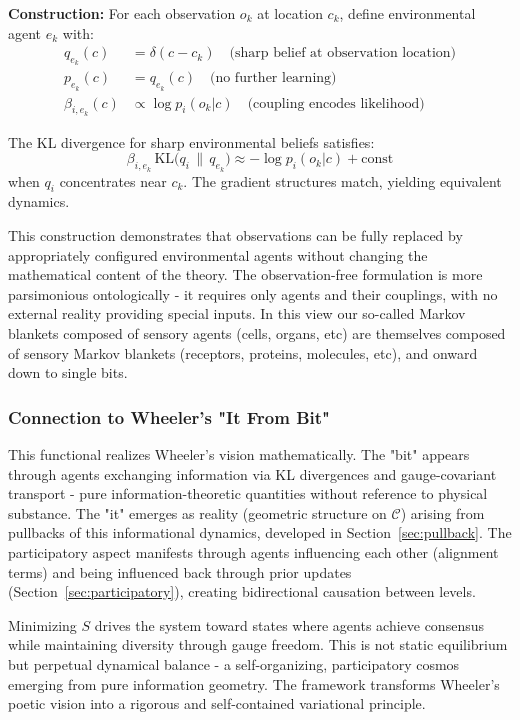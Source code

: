 \documentclass[11pt]{article}
\begin{document}
\textbf{Construction:} For each observation $o_k$ at location $c_k$, define environmental agent $e_k$ with:
\begin{align}
q_{e_k}(c) &= \delta(c - c_k) \quad \text{(sharp belief at observation location)} \\
p_{e_k}(c) &= q_{e_k}(c) \quad \text{(no further learning)} \\
\beta_{i,e_k}(c) &\propto \log p_i(o_k|c) \quad \text{(coupling encodes likelihood)}
\end{align}

The KL divergence for sharp environmental beliefs satisfies:
\begin{equation}
\beta_{i,e_k} \, \mathrm{KL}\big(q_i \,\|\, q_{e_k}\big) \approx -\log p_i(o_k|c) + \text{const}
\end{equation}
when $q_i$ concentrates near $c_k$. The gradient structures match, yielding equivalent dynamics.

This construction demonstrates that observations can be fully replaced by appropriately configured environmental agents without changing the mathematical content of the theory. The observation-free formulation is more parsimonious ontologically - it requires only agents and their couplings, with no external reality providing special inputs. In this view our so-called Markov blankets  composed of sensory agents (cells, organs, etc) are themselves composed of sensory Markov blankets (receptors, proteins, molecules, etc), and onward down to single bits.



\subsubsection{Connection to Wheeler's "It From Bit"}

This functional realizes Wheeler's vision mathematically. The "bit" appears through agents exchanging information via KL divergences and gauge-covariant transport - pure information-theoretic quantities without reference to physical substance. The "it" emerges as reality (geometric structure on $\mathcal{C}$) arising from pullbacks of this informational dynamics, developed in Section~\ref{sec:pullback}. The participatory aspect manifests through agents influencing each other (alignment terms) and being influenced back through prior updates (Section~\ref{sec:participatory}), creating bidirectional causation between levels.

Minimizing $S$ drives the system toward states where agents achieve consensus while maintaining diversity through gauge freedom. This is not static equilibrium but perpetual dynamical balance - a self-organizing, participatory cosmos emerging from pure information geometry. The framework transforms Wheeler's poetic vision into a rigorous and self-contained variational principle.
\end{document}

